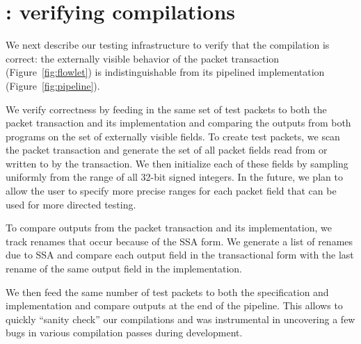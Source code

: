 \section{\tester: verifying compilations}
\label{s:tester}
We next describe our testing infrastructure to verify that the compilation is
correct: the externally visible behavior of the packet transaction
(Figure~\ref{fig:flowlet}) is indistinguishable from its pipelined
implementation (Figure~\ref{fig:pipeline}).

We verify correctness by feeding in the same set of test packets to both the
packet transaction and its implementation and comparing the outputs from both
programs on the set of externally visible fields. To create test packets, we
scan the packet transaction and generate the set of all packet fields read from
or written to by the transaction. We then initialize each of these fields by
sampling uniformly from the range of all 32-bit signed integers. In the future,
we plan to allow the user to specify more precise ranges for each packet field
that can be used for more directed testing.

To compare outputs from the packet transaction and its implementation, we track
renames that occur because of the SSA form. We generate a list of renames due
to SSA and compare each output field in the transactional form with the last
rename of the same output field in the implementation.

We then feed the same number of test packets to both the specification and
implementation and compare outputs at the end of the pipeline. This allows to
quickly ``sanity check'' our compilations and was instrumental in uncovering a
few bugs in various compilation passes during development.
